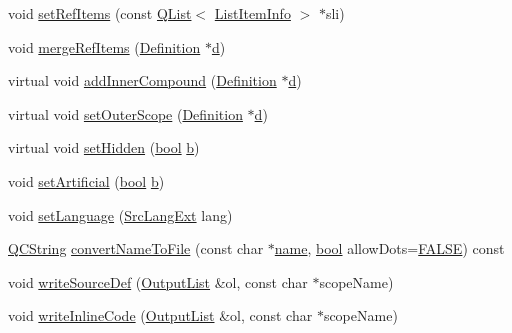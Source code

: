 \begin{DoxyCompactItemize}
\item 
void \hyperlink{class_definition_afaacdadf442e3e1a33c22c5a2b49ad61}{set\+Ref\+Items} (const \hyperlink{class_q_list}{Q\+List}$<$ \hyperlink{struct_list_item_info}{List\+Item\+Info} $>$ $\ast$sli)
\item 
void \hyperlink{class_definition_ac7a24516e805c39e3f3542c387601790}{merge\+Ref\+Items} (\hyperlink{class_definition}{Definition} $\ast$\hyperlink{060__command__switch_8tcl_af43f4b1f0064a33b2d662af9f06d3a00}{d})
\item 
virtual void \hyperlink{class_definition_a7acd14f8896e56cc2d6dcadd2cf14be7}{add\+Inner\+Compound} (\hyperlink{class_definition}{Definition} $\ast$\hyperlink{060__command__switch_8tcl_af43f4b1f0064a33b2d662af9f06d3a00}{d})
\item 
virtual void \hyperlink{class_definition_a222010f3d2b52bf76427034d07e0ff56}{set\+Outer\+Scope} (\hyperlink{class_definition}{Definition} $\ast$\hyperlink{060__command__switch_8tcl_af43f4b1f0064a33b2d662af9f06d3a00}{d})
\item 
virtual void \hyperlink{class_definition_a7166ab248989769fe2dc4f0d56b72a05}{set\+Hidden} (\hyperlink{qglobal_8h_a1062901a7428fdd9c7f180f5e01ea056}{bool} \hyperlink{060__command__switch_8tcl_a68bdb74c144118d936931c46f75d4b3e}{b})
\item 
void \hyperlink{class_definition_a3bef4741c9dfa6cd2287ca4c9f30f775}{set\+Artificial} (\hyperlink{qglobal_8h_a1062901a7428fdd9c7f180f5e01ea056}{bool} \hyperlink{060__command__switch_8tcl_a68bdb74c144118d936931c46f75d4b3e}{b})
\item 
void \hyperlink{class_definition_abd33a001047f6842f63f551b1ce47942}{set\+Language} (\hyperlink{types_8h_a9974623ce72fc23df5d64426b9178bf2}{Src\+Lang\+Ext} lang)
\item 
\hyperlink{class_q_c_string}{Q\+C\+String} \hyperlink{class_definition_ad320a919f0dcfd4738b7d0f0045b42fe}{convert\+Name\+To\+File} (const char $\ast$\hyperlink{class_definition_a99481361779e85f0c1556709de7d9e5b}{name}, \hyperlink{qglobal_8h_a1062901a7428fdd9c7f180f5e01ea056}{bool} allow\+Dots=\hyperlink{qglobal_8h_a10e004b6916e78ff4ea8379be80b80cc}{F\+A\+L\+S\+E}) const 
\item 
void \hyperlink{class_definition_a0d22dcffc0afca75f8ab31dd6261933f}{write\+Source\+Def} (\hyperlink{class_output_list}{Output\+List} \&ol, const char $\ast$scope\+Name)
\item 
void \hyperlink{class_definition_ad5ad17068a22165040e5b256c564c603}{write\+Inline\+Code} (\hyperlink{class_output_list}{Output\+List} \&ol, const char $\ast$scope\+Name)

\end{DoxyCompactItemize}
